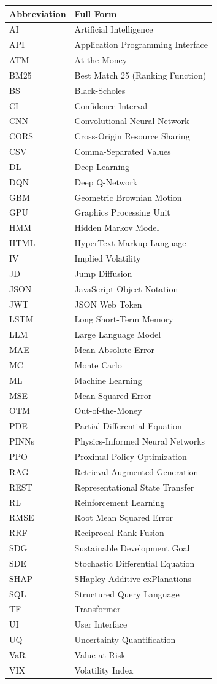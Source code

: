 \documentclass[12pt,a4paper]{report}
\begin{document}
\begin{longtable}{p{3cm}p{10cm}}
\toprule
\textbf{Abbreviation} & \textbf{Full Form} \\
\midrule
\endhead
AI & Artificial Intelligence \\
API & Application Programming Interface \\
ATM & At-the-Money \\
BM25 & Best Match 25 (Ranking Function) \\
BS & Black-Scholes \\
CI & Confidence Interval \\
CNN & Convolutional Neural Network \\
CORS & Cross-Origin Resource Sharing \\
CSV & Comma-Separated Values \\
DL & Deep Learning \\
DQN & Deep Q-Network \\
GBM & Geometric Brownian Motion \\
GPU & Graphics Processing Unit \\
HMM & Hidden Markov Model \\
HTML & HyperText Markup Language \\
IV & Implied Volatility \\
JD & Jump Diffusion \\
JSON & JavaScript Object Notation \\
JWT & JSON Web Token \\
LSTM & Long Short-Term Memory \\
LLM & Large Language Model \\
MAE & Mean Absolute Error \\
MC & Monte Carlo \\
ML & Machine Learning \\
MSE & Mean Squared Error \\
OTM & Out-of-the-Money \\
PDE & Partial Differential Equation \\
PINNs & Physics-Informed Neural Networks \\
PPO & Proximal Policy Optimization \\
RAG & Retrieval-Augmented Generation \\
REST & Representational State Transfer \\
RL & Reinforcement Learning \\
RMSE & Root Mean Squared Error \\
RRF & Reciprocal Rank Fusion \\
SDG & Sustainable Development Goal \\
SDE & Stochastic Differential Equation \\
SHAP & SHapley Additive exPlanations \\
SQL & Structured Query Language \\
TF & Transformer \\
UI & User Interface \\
UQ & Uncertainty Quantification \\
VaR & Value at Risk \\
VIX & Volatility Index \\
\bottomrule
\end{longtable}
\end{document}
